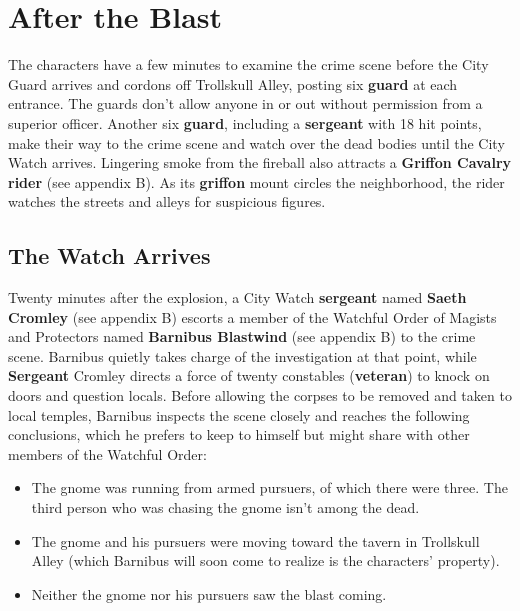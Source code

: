 \documentclass[10pt,a4paper,twoside,twocolumn,openany,nodeprecatedcode]{dndbook}
\begin{document}
\section{After the Blast}
The characters have a few minutes to examine the crime scene before the City Guard arrives and cordons off Trollskull Alley, posting six \textbf{guard} at each entrance. The guards don't allow anyone in or out without permission from a superior officer. Another six \textbf{guard}, including a \textbf{sergeant} with 18 hit points, make their way to the crime scene and watch over the dead bodies until the City Watch arrives. Lingering smoke from the fireball also attracts a \textbf{Griffon Cavalry rider} (see appendix B). As its \textbf{griffon} mount circles the neighborhood, the rider watches the streets and alleys for suspicious figures.
\subsection{The Watch Arrives}
Twenty minutes after the explosion, a City Watch \textbf{sergeant} named \textbf{Saeth Cromley} (see appendix B) escorts a member of the Watchful Order of Magists and Protectors named \textbf{Barnibus Blastwind} (see appendix B) to the crime scene. Barnibus quietly takes charge of the investigation at that point, while \textbf{Sergeant} Cromley directs a force of twenty constables (\textbf{veteran}) to knock on doors and question locals.
Before allowing the corpses to be removed and taken to local temples, Barnibus inspects the scene closely and reaches the following conclusions, which he prefers to keep to himself but might share with other members of the Watchful Order:
\begin{itemize}

\item The gnome was running from armed pursuers, of which there were three. The third person who was chasing the gnome isn't among the dead.
\item The gnome and his pursuers were moving toward the tavern in Trollskull Alley (which Barnibus will soon come to realize is the characters' property).
\item Neither the gnome nor his pursuers saw the blast coming.
\end{itemize}
\end{document}
